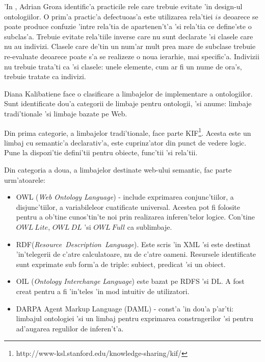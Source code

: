 \documentclass[12pt,a4paper,twoside]{report}
\begin{document}
'In \cite{Press2014AdrianApproach}, Adrian Groza identific'a practicile rele care trebuie evitate 'in design-ul ontologiilor. O prim'a practic'a defectuoas'a este utilizarea rela'tiei $is$ deoarece se poate produce confuzie 'intre rela'tia de apartenen't'a 'si rela'tia ce define'ste o subclas'a. Trebuie evitate rela'tiile inverse care nu sunt declarate 'si clasele care nu au indivizi. Clasele care de'tin un num'ar mult prea mare de subclase trebuie re-evaluate deoarece poate s'a se realizeze o noua ierarhie, mai specific'a. Indivizii nu trebuie trata'ti ca 'si clasele: unele elemente, cum ar fi un nume de ora's, trebuie tratate ca indivizi.

Diana Kalibatiene \cite{owl_languages} face o clasificare a limbajelor de implementare a ontologiilor. Sunt identificate dou'a categorii de limbaje pentru ontologii, 'si anume: limbaje tradi'tionale 'si limbaje bazate pe Web. 

Din prima categorie, a limbajelor tradi'tionale, face parte KIF\footnote{http://www-ksl.stanford.edu/knowledge-sharing/kif/}. Acesta este un limbaj cu semantic'a declarativ'a, este cuprinz'ator din punct de vedere logic. Pune la dispozi'tie defini'tii pentru obiecte, func'tii 'si rela'tii.

Din categoria a doua, a limbajelor destinate web-ului semantic, fac parte urm'atoarele:

\begin{itemize}
    \item OWL ({\it Web Ontology Language}) - include exprimarea conjunc'tiilor, a disjunc'tiilor, a variabileleor cuatificate universal. Acestea pot fi folosite pentru a ob'tine cunos'tin'te noi prin realizarea inferen'telor logice. Con'tine $OWL\ Lite$, $OWL\ DL$ 'si $OWL\ Full$ ca sublimbaje.
    \item RDF({\it Resource\ Description\ Language}). Este scris 'in XML 'si este destinat 'in'telegerii de c'atre calculatoare, nu de c'atre oameni. Resursele identificate sunt exprimate sub form'a de triple: subiect, predicat 'si un obiect. 
    \item OIL ({\it Ontology Interchange Language}) este bazat pe RDFS 'si DL. A fost creat pentru a fi 'in'teles 'in mod intuitiv de utilizatori. 
    \item DARPA Agent Markup Language (DAML) - const'a 'in dou'a p'ar'ti: limbajul ontologiei  'si un limbaj pentru exprimarea constr\ia ngerilor 'si pentru ad'augarea regulilor de inferen't'a.
\end{itemize}
\end{document}
